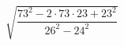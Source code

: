 \begin{ex}[type=calculate]
	\begin{condition}
		\( \sqrt{\dfrac{73^2-2\cdot73\cdot23+23^2}{26^2-24^2}} \)
	\end{condition}
\end{ex}